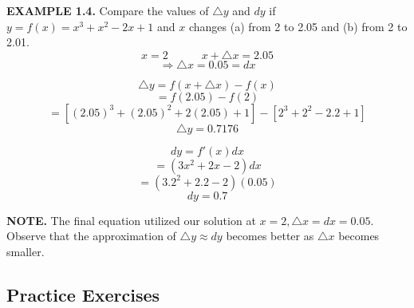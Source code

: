 \documentclass[12pt]{article}
\newcommand{\follow}{\bigskip\noindent}
\newcommand{\spaces}{\quad\quad\quad}
\begin{document}
    \newpage\follow\textbf{EXAMPLE 1.4.}
    Compare the values of \(\triangle{y}\) and \(dy\) if \(y = f(x) = x^3 + x^2 - 2x + 1\) and \(x\) changes (a) from 2 to 2.05 and (b) from 2 to 2.01.
    \[x = 2 \spaces x + \triangle{x} = 2.05\]
    \[\Rightarrow \triangle{x} = 0.05 = dx\]

    \[\triangle{y} = f(x + \triangle{x}) - f(x)\]
    \[= f(2.05) - f(2)\]
    \[= [{(2.05)}^3 + {(2.05)}^2 + 2(2.05) + 1] - [2^3 + 2^2 - 2.2 + 1]\]
    \[\triangle{y} = 0.7176\]

    \[dy = f'(x)dx\]
    \[= (3x^2 + 2x - 2)dx\]
    \[= (3.2^2 + 2.2 - 2)(0.05)\]
    \[dy = 0.7\]

    \follow\textbf{NOTE.}
    The final equation utilized our solution at \(x = 2, \triangle{x} = dx = 0.05\).
    Observe that the approximation of \(\triangle{y} \approx dy\) becomes better as \(\triangle{x}\) becomes smaller.

\newpage\subsection*{Practice Exercises}
\end{document}
